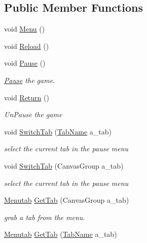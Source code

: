 \subsection*{Public Member Functions}
\begin{DoxyCompactItemize}
\item 
void \mbox{\hyperlink{class_in_game_menu_af1d58606ef97e81ace3ea2ca2cdf84e3}{Menu}} ()
\item 
void \mbox{\hyperlink{class_in_game_menu_a455c5f6f21a56dfad09d486273b9a8f2}{Reload}} ()
\item 
void \mbox{\hyperlink{class_in_game_menu_a4152163786e7bac9161961f929778ca2}{Pause}} ()
\begin{DoxyCompactList}\small\item\em \mbox{\hyperlink{class_pause}{Pause}} the game. \end{DoxyCompactList}\item 
void \mbox{\hyperlink{class_in_game_menu_a7e379f478881365b7c2cb3c859e7d33c}{Return}} ()
\begin{DoxyCompactList}\small\item\em Un\+Pause the game \end{DoxyCompactList}\item 
void \mbox{\hyperlink{class_in_game_menu_af70346b7177eacd7ae47dd20ec06b037}{Switch\+Tab}} (\mbox{\hyperlink{_in_game_menu_8cs_a87eb828d74fde9afa783aa42bfe61b96}{Tab\+Name}} a\+\_\+tab)
\begin{DoxyCompactList}\small\item\em select the current tab in the pause menu \end{DoxyCompactList}\item 
void \mbox{\hyperlink{class_in_game_menu_abcbcdfc565a34ce1c14499eac852befb}{Switch\+Tab}} (Canvas\+Group a\+\_\+tab)
\begin{DoxyCompactList}\small\item\em select the current tab in the pause menu \end{DoxyCompactList}\item 
\mbox{\hyperlink{class_in_game_menu_1_1_menutab}{Menutab}} \mbox{\hyperlink{class_in_game_menu_a47ad33d1d7eee44053bbe3488d39fb90}{Get\+Tab}} (Canvas\+Group a\+\_\+tab)
\begin{DoxyCompactList}\small\item\em grab a tab from the menu. \end{DoxyCompactList}\item 
\mbox{\hyperlink{class_in_game_menu_1_1_menutab}{Menutab}} \mbox{\hyperlink{class_in_game_menu_a41c4b21e038abe4744bf9be44b391fbb}{Get\+Tab}} (\mbox{\hyperlink{_in_game_menu_8cs_a87eb828d74fde9afa783aa42bfe61b96}{Tab\+Name}} a\+\_\+tab)

\end{DoxyCompactItemize}
